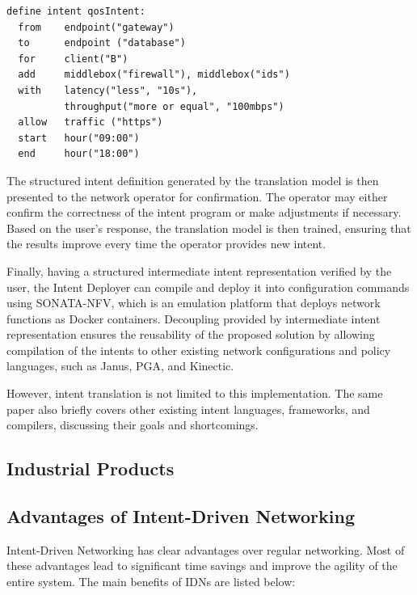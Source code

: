 \begin{lstlisting}[language=Nile,float=ht,caption={Nile intent example\cite{Jacobs2018}},label=lst:nile_intent_example]
define intent qosIntent:
  from    endpoint("gateway")
  to      endpoint ("database")
  for     client("B")
  add     middlebox("firewall"), middlebox("ids")
  with    latency("less", "10s"),
          throughput("more or equal", "100mbps")
  allow   traffic ("https")
  start   hour("09:00")
  end     hour("18:00")
\end{lstlisting}

The structured intent definition generated by the translation model is then presented to the network operator for confirmation. The operator may either confirm the correctness of the intent program or make adjustments if necessary. Based on the user’s response, the translation model is then trained, ensuring that the results improve every time the operator provides new intent.

Finally, having a structured intermediate intent representation verified by the user, the Intent Deployer can compile and deploy it into configuration commands using SONATA-NFV, which is an emulation platform that deploys network functions as Docker containers. Decoupling provided by intermediate intent representation ensures the reusability of the proposed solution by allowing compilation of the intents to other existing network configurations and policy languages, such as Janus, PGA, and Kinectic.

However, intent translation is not limited to this implementation. The same paper \cite[20]{Jacobs2018} also briefly covers other existing intent languages, frameworks, and compilers, discussing their goals and shortcomings.
	

\subsection{Industrial Products}



\subsection{Advantages of Intent-Driven Networking}

Intent-Driven Networking has clear advantages over regular networking. Most of these advantages lead to significant time savings and improve the agility of the entire system\cite{Kolibri}. The main benefits of IDNs are listed below:\cite[11]{MartinezJulia2022}


